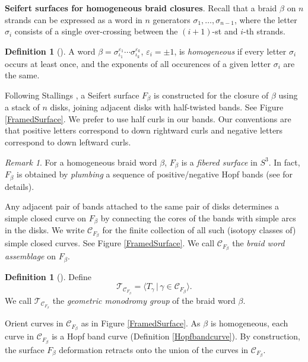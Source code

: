 \documentclass[10pt]{amsart}
\numberwithin{equation}{section}
\theoremstyle{plain}
\theoremstyle{definition}
\newtheorem{defn}[theorem]{Definition}
\theoremstyle{remark}
\newtheorem{rmk}[theorem]{Remark}
\begin{document}
\textbf{Seifert surfaces for homogeneous braid closures}. Recall that a braid $\beta$ on $n$ strands can be expressed as a word in $n$ generators $\sigma_1,\ldots,\sigma_{n-1}$, where the letter $\sigma_i$ consists of a single over-crossing between the $(i+1)$-st and $i$-th strands. 

\begin{defn}[\cite{Stallings}]
A word $\beta = \sigma_{\iota_1}^{\varepsilon_1}\cdots \sigma_{\iota_k}^{\varepsilon_k}$, $\varepsilon_i = \pm 1$, is \textit{homogeneous} if every letter $\sigma_i$ occurs at least once, and the exponents of all occurences of a given letter $\sigma_i$ are the same.
\end{defn}

Following Stallings \cite{Stallings}, a Seifert surface $F_\beta$ is constructed for the closure of $\beta$ using a stack of $n$ disks, joining adjacent disks with half-twisted bands. See Figure \ref{FramedSurface}. We prefer to use half curls in our bands. Our conventions are that positive letters correspond to down rightward curls and negative letters correspond to down leftward curls. 

\begin{rmk}
For a homogeneous braid word $\beta$, $F_\beta$ is a \textit{fibered surface} in $S^3$. In fact, $F_\beta$ is obtained by \textit{plumbing} a sequence of positive/negative Hopf bands (see \cite{Stallings} for details).  
\end{rmk}

Any adjacent pair of bands attached to the same pair of disks determines a simple closed curve on $F_\beta$ by connecting the cores of the bands with simple arcs in the disks. We write $\mathcal{C}_{F_\beta}$ for the finite collection of all such (isotopy classes of) simple closed curves. See Figure \ref{FramedSurface}. We call $\mathcal{C}_{F_\beta}$ the \textit{braid word assemblage} on $F_\beta$. 

\begin{defn}[\cite{Ferretti}]
Define \[\mathcal{T}_{\mathcal{C}_{F_\beta}} = \langle T_{\gamma} \,|\, \gamma \in \mathcal{C}_{F_\beta}\rangle.\] We call $\mathcal{T}_{\mathcal{C}_{F_\beta}}$ the \textit{geometric monodromy group} of the braid word $\beta$.  
\end{defn}

Orient curves in $\mathcal{C}_{F_\beta}$ as in Figure \ref{FramedSurface}. As $\beta$ is homogeneous, each curve in $\mathcal{C}_{F_\beta}$ is a Hopf band curve (Definition \ref{Hopfbandcurve}). By construction, the surface $F_\beta$ deformation retracts onto the union of the curves in $\mathcal{C}_{F_\beta}$. \newline
\end{document}
